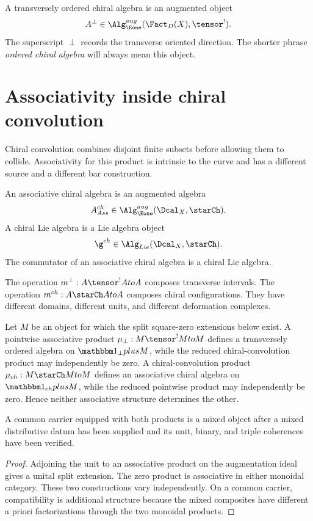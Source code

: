 \begin{definition}
A transversely ordered chiral algebra is an augmented object
\[
 A^\perp\in\Alg_{\Eone}^{\mathrm{aug}}(\Fact_D(X),\tensor^!).
\]
The superscript $\perp$ records the transverse oriented direction.  The shorter phrase \emph{ordered chiral algebra} will always mean this object.
\end{definition}

\section{Associativity inside chiral convolution}
Chiral convolution combines disjoint finite subsets before allowing them to collide.  Associativity for this product is intrinsic to the curve and has a different source and a different bar construction.

\begin{definition}
An associative chiral algebra is an augmented algebra
\[
 A^{\ch}_{\mathsf{Ass}}
 \in\Alg_{\Eone}^{\mathrm{aug}}(\Dcal_X,\starCh).
\]
A chiral Lie algebra is a Lie algebra object
\[
 \g^{\ch}\in\Alg_{\mathsf{Lie}}(\Dcal_X,\starCh).
\]
The commutator of an associative chiral algebra is a chiral Lie algebra.
\end{definition}

The operation $m^\perp:A\tensor^!A\to A$ composes transverse intervals.  The operation
$m^{\ch}:A\starCh A\to A$ composes chiral configurations.  They have different domains, different units, and different deformation complexes.

\begin{theorem}
Let $M$ be an object for which the split square-zero extensions below exist.  A pointwise associative product $\mu_\perp:M\tensor^!M\to M$ defines a transversely ordered algebra on $\mathbbm1_\perp\oplus M$, while the reduced chiral-convolution product may independently be zero.  A chiral-convolution product $\mu_{\ch}:M\starCh M\to M$ defines an associative chiral algebra on $\mathbbm1_{\ch}\oplus M$, while the reduced pointwise product may independently be zero.  Hence neither associative structure determines the other.

A common carrier equipped with both products is a mixed object after a mixed distributive datum has been supplied and its unit, binary, and triple coherences have been verified.
\end{theorem}
\begin{proof}
Adjoining the unit to an associative product on the augmentation ideal gives a unital split extension.  The zero product is associative in either monoidal category.  These two constructions vary independently.  On a common carrier, compatibility is additional structure because the mixed composites have different a priori factorizations through the two monoidal products.
\end{proof}

